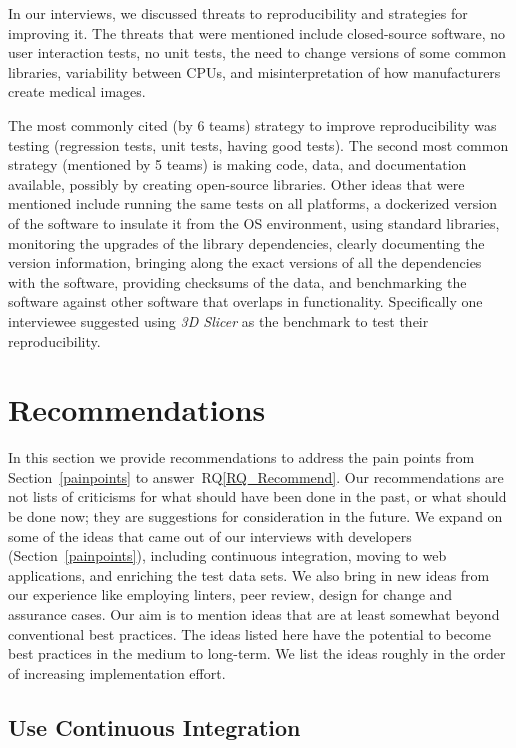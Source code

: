 \documentclass[final, 3p, times, authoryear]{elsarticle}
\newcommand{\rqref}[1]{RQ\ref{#1}}
\begin{document}
\begin{enumerate}
In our interviews, we discussed threats to reproducibility and strategies for
improving it.  The threats that were mentioned include closed-source software,
no user interaction tests, no unit tests, the need to change versions of some
common libraries, variability between CPUs, and misinterpretation of how
manufacturers create medical images. 

The most commonly cited (by 6 teams) strategy to improve reproducibility was
testing (regression tests, unit tests, having good tests). The second most
common strategy (mentioned by 5 teams) is making code, data, and documentation
available, possibly by creating open-source libraries.  Other ideas that were
mentioned include running the same tests on all platforms, a dockerized version
of the software to insulate it from the OS environment, using standard
libraries, monitoring the upgrades of the library dependencies, clearly
documenting the version information, bringing along the exact versions of all
the dependencies with the software, providing checksums of the data, and
benchmarking the software against other software that overlaps in functionality.
Specifically one interviewee suggested using \textit{3D Slicer} as the benchmark
to test their reproducibility.

\end{enumerate}

\section{Recommendations} \label{ch_recommendations}

In this section we provide recommendations to address the pain points from
Section~\ref{painpoints} to answer~\rqref{RQ_Recommend}.  Our recommendations
are not lists of criticisms for what should have been done in the past, or what
should be done now; they are suggestions for consideration in the future. We
expand on some of the ideas that came out of our interviews with developers
(Section~\ref{painpoints}), including continuous integration, moving to web
applications, and enriching the test data sets. We also bring in new ideas from
our experience like employing linters, peer review, design for change and
assurance cases.  Our aim is to mention ideas that are at least somewhat beyond
conventional best practices. The ideas listed here have the potential to become
best practices in the medium to long-term. We list the ideas roughly in the
order of increasing implementation effort.

\subsection{Use Continuous Integration} \label{Sec_ContinuousIntegration}
\end{document}
